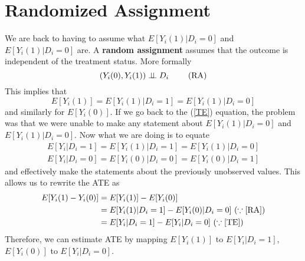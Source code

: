 \section{Randomized Assignment}
We are back to having to assume what $E[Y_i(1)|D_i=0]$ and $E[Y_i(1)|D_i=0]$ are. A \textbf{random assignment} assumes that the outcome is independent of the treatment status. More formally
\[
(Y_i(0), Y_i(1))\perp \!\!\! \perp D_i \ \tag{\text{RA}}\label{RA}
\]
This implies that
\[
E[Y_i(1)]=E[Y_i(1)|D_i=1]=E[Y_i(1)|D_i=0]
\]
and similarly for $E[Y_i(0)]$. If we go back to the (\ref{TE}) equation, the problem was that we were unable to make any statement about $E[Y_i(1)|D_i=0]$ and $E[Y_i(1)|D_i=0]$. Now what we are doing is to equate
\begin{gather*}
E[Y_i|D_i=1]=E[Y_i(1)|D_i=1]=E[Y_i(1)|D_i=0]\\
 E[Y_i|D_i=0]=E[Y_i(0)|D_i=0]=E[Y_i(0)|D_i=1]
\end{gather*}
and effectively make the statements about the previously unobserved values. This allows us to rewrite the ATE as 
\begin{align*}
E[Y_i(1)-Y_i(0)]&=E[Y_i(1)]-E[Y_i(0)]\\
&=E[Y_i(1)|D_i=1]-E[Y_i(0)|D_i=0] \ (\because \ref{RA})\\
&=E[Y_i|D_i=1]-E[Y_i|D_i=0] \ (\because \ref{TE})
\end{align*}
Therefore, we can estimate ATE by mapping $E[Y_i(1)]$ to $E[Y_i|D_i=1]$, $E[Y_i(0)]$ to $E[Y_i|D_i=0]$. 
